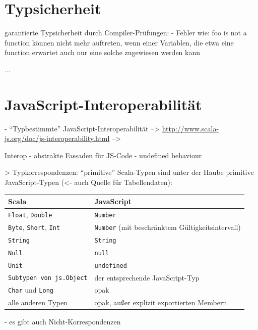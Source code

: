 \documentclass[a4paper, 12pt, hidelinks, listof=totoc, listoftables=totoc, bibliography=totoc]{scrreprt}
\begin{document}
\section{Typsicherheit}

garantierte Typsicherheit durch Compiler-Prüfungen:
- Fehler wie: foo is not a function können nicht mehr auftreten, wenn einer Variablen, die etwa eine function erwartet auch nur eine solche zugewiesen werden kann

...




\section{JavaScript-Interoperabilität}

- "`Typbestimmte"' JavaScript-Interoperabilität
-->  \url{http://www.scala-js.org/doc/js-interoperability.html}
-->  \cite{doeraene2013.TDI}

Interop
- abstrakte Fassaden für JS-Code
- undefined behaviour


> Typkorrespondenzen: "`primitive"' Scala-Typen sind unter der Haube primitive JavaScript-Typen\cite{doeraene2014.WHB} (<- auch Quelle für Tabellendaten):

\medskip

\begin{tabular}{|l|l|}
\hline \textbf{Scala} & \textbf{JavaScript} \\ 
\hline \texttt{Float}, \texttt{Double} & \texttt{Number} \\ 
\hline \texttt{Byte}, \texttt{Short}, \texttt{Int} & \texttt{Number} (mit beschränktem Gültigkeitsintervall) \\ 
\hline \texttt{String} & \texttt{String} \\ 
\hline \texttt{Null} & \texttt{null} \\ 
\hline \texttt{Unit} & \texttt{undefined} \\ 
\hline \texttt{Subtypen von js.Object} & der entsprechende JavaScript-Typ \\ 
\hline \texttt{Char} und \texttt{Long} & opak \\ 
\hline alle anderen Typen & opak, außer explizit exportierten Membern \\ 
\hline 
\end{tabular}

\medskip


- es gibt auch Nicht-Korrespondenzen
\end{document}
